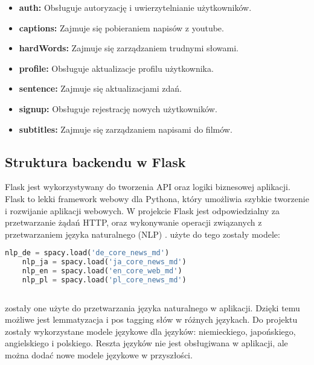 \begin{itemize}
    \item \textbf{auth:} Obsługuje autoryzację i uwierzytelnianie użytkowników.
    \item \textbf{captions:} Zajmuje się pobieraniem napisów z youtube.
    \item \textbf{hardWords:} Zajmuje się zarządzaniem trudnymi słowami.
    \item \textbf{profile:} Obsługuje aktualizacje profilu użytkownika.
    \item \textbf{sentence:} Zajmuje się aktualizacjami zdań.
    \item \textbf{signup:} Obsługuje rejestrację nowych użytkowników.
    \item \textbf{subtitles:} Zajmuje się zarządzaniem napisami do filmów.
\end{itemize}

\subsection{Struktura backendu w Flask}
Flask jest wykorzystywany do tworzenia API oraz logiki biznesowej aplikacji. Flask to lekki framework webowy dla Pythona, który umożliwia szybkie tworzenie i rozwijanie aplikacji webowych. W projekcie Flask jest odpowiedzialny za przetwarzanie żądań HTTP, oraz wykonywanie operacji związanych z przetwarzaniem języka naturalnego (NLP) \cite{fountoulakis2024evaluating} \cite{abusahyon2023ai}.
użyte do tego zostały modele:

\begin{lstlisting}[language=Python, caption=kod do importowania modeli NLP]
    nlp_de = spacy.load('de_core_news_md')
    nlp_ja = spacy.load('ja_core_news_md')
    nlp_en = spacy.load('en_core_web_md')
    nlp_pl = spacy.load('pl_core_news_md')
    
\end{lstlisting}

zostały one użyte do przetwarzania języka naturalnego w aplikacji. Dzięki temu możliwe jest lemmatyzacja i pos tagging słów w różnych językach. Do projektu zostały wykorzystane modele językowe dla języków: niemieckiego, japońskiego, angielskiego i polskiego. Reszta języków nie jest obsługiwana w aplikacji, ale można dodać nowe modele językowe w przyszłości.

